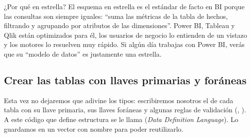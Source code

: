\begin{negocio}{¿Por qué en estrella?}
El esquema en estrella es el estándar de facto en BI porque las consultas
son siempre iguales: ``suma las métricas de la tabla de hechos, filtrando y
agrupando por atributos de las dimensiones''. Power BI, Tableau y Qlik
están optimizados para él, los usuarios de negocio lo entienden de un
vistazo y los motores lo resuelven muy rápido. Si algún día trabajas con
Power BI, verás que su ``modelo de datos'' es justamente una estrella.
\end{negocio}

\subsection{Crear las tablas con llaves primarias y foráneas}

Esta vez no dejaremos que  adivine los tipos:
escribiremos nosotros el  de cada tabla con su llave
primaria, sus llaves foráneas y algunas reglas de validación
(, ). A este código que define estructura se
le llama  (\emph{Data Definition Language}). Lo guardamos en un
vector con nombre para poder reutilizarlo.

